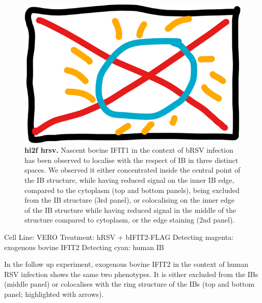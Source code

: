 \begin{figure}
    \centering
    \includegraphics[width=1\linewidth]{10. Chapter 5/Figs/00. placeholder.png}
    \caption[hi2f hrsv]{\textbf{hi2f hrsv.} Nascent bovine IFIT1 in the context of bRSV infection has been observed to localise with the respect of IB in three distinct spaces. We observed it either concentrated inside the central point of the IB structure, while having reduced signal on the inner IB edge, compared to the cytoplasm (top and bottom panels), being excluded from the IB structure (3rd panel), or colocalising on the inner edge of the IB structure while having reduced signal in the middle of the structure compared to cytoplasm, or the edge staining (2nd panel).}
    \label{fig:hi2f hrsv}
\end{figure}

Cell Line: VERO \newline
Treatment: hRSV + bIFIT2-FLAG \newline
Detecting magenta: exogenous bovine IFIT2 \newline
Detecting cyan: human IB \newline

In the follow up experiment, exogenous bovine IFIT2 in the context of human RSV infection shows the same two phenotypes. It is either excluded from the IBs (middle panel) or colocalises with the ring structure of the IBs (top and bottom panel; highlighted with arrows).

